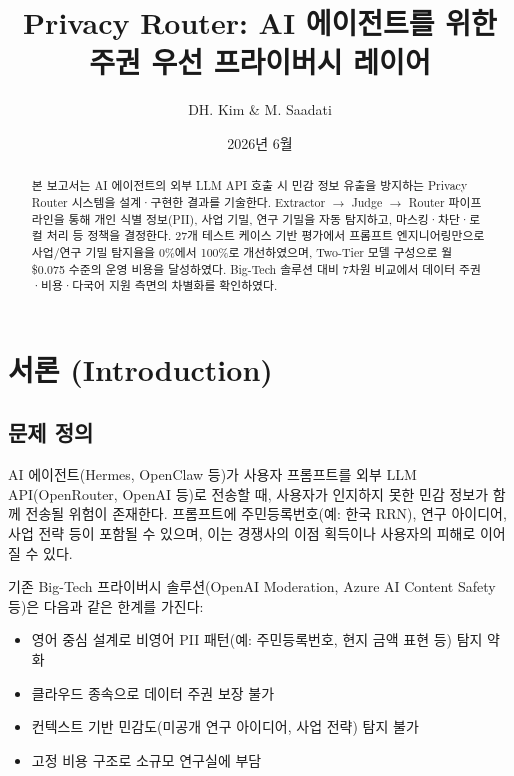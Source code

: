 \documentclass[11pt,a4paper]{article}
\title{Privacy Router: AI 에이전트를 위한 주권 우선 프라이버시 레이어}
\author{DH. Kim \& M. Saadati}
\date{2026년 6월}
\begin{document}
\maketitle

\begin{abstract}
본 보고서는 AI 에이전트의 외부 LLM API 호출 시 민감 정보 유출을 방지하는 Privacy Router 시스템을 설계·구현한 결과를 기술한다. Extractor $\rightarrow$ Judge $\rightarrow$ Router 파이프라인을 통해 개인 식별 정보(PII), 사업 기밀, 연구 기밀을 자동 탐지하고, 마스킹·차단·로컬 처리 등 정책을 결정한다. 27개 테스트 케이스 기반 평가에서 프롬프트 엔지니어링만으로 사업/연구 기밀 탐지율을 0\%에서 100\%로 개선하였으며, Two-Tier 모델 구성으로 월 \$0.075 수준의 운영 비용을 달성하였다. Big-Tech 솔루션 대비 7차원 비교에서 데이터 주권·비용·다국어 지원 측면의 차별화를 확인하였다.
\end{abstract}

\tableofcontents
\newpage

\section{서론 (Introduction)}

\subsection{문제 정의}

AI 에이전트(Hermes, OpenClaw 등)가 사용자 프롬프트를 외부 LLM API(OpenRouter, OpenAI 등)로 전송할 때, 사용자가 인지하지 못한 민감 정보가 함께 전송될 위험이 존재한다. 프롬프트에 주민등록번호(예: 한국 RRN), 연구 아이디어, 사업 전략 등이 포함될 수 있으며, 이는 경쟁사의 이점 획득이나 사용자의 피해로 이어질 수 있다.

기존 Big-Tech 프라이버시 솔루션(OpenAI Moderation, Azure AI Content Safety 등)은 다음과 같은 한계를 가진다:

\begin{itemize}[nosep]
  \item 영어 중심 설계로 비영어 PII 패턴(예: 주민등록번호, 현지 금액 표현 등) 탐지 약화
  \item 클라우드 종속으로 데이터 주권 보장 불가
  \item 컨텍스트 기반 민감도(미공개 연구 아이디어, 사업 전략) 탐지 불가
  \item 고정 비용 구조로 소규모 연구실에 부담
\end{itemize}
\end{document}
